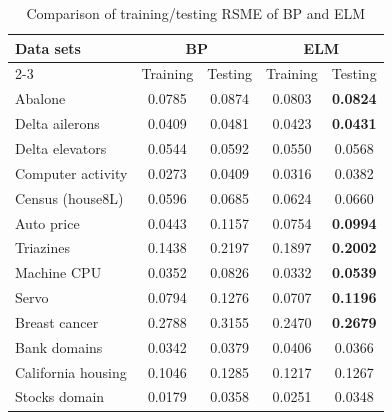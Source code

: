 \documentclass[12pt]{article}
\begin{document}
\begin{table}[h]
\centering
\caption{Comparison of training/testing RSME of BP and ELM}
\label{tab:elm_bp}
\begin{tabular}{@{}lcccc@{}}
\hline
\textbf{Data sets} & \multicolumn{2}{c}{\textbf{BP}} & \multicolumn{2}{c}{\textbf{ELM}} \\
\cline{2-3} \cline{4-5}
 & Training & Testing & Training & Testing \\
\hline
Abalone & 0.0785 & 0.0874 & 0.0803 & \textbf{0.0824} \\
Delta ailerons & 0.0409 & 0.0481 & 0.0423 & \textbf{0.0431} \\
Delta elevators & 0.0544 & 0.0592 & 0.0550 & 0.0568 \\
Computer activity & 0.0273 & 0.0409 & 0.0316 & 0.0382 \\
Census (house8L) & 0.0596 & 0.0685 & 0.0624 & 0.0660 \\
Auto price & 0.0443 & 0.1157 & 0.0754 & \textbf{0.0994} \\
Triazines & 0.1438 & 0.2197 & 0.1897 & \textbf{0.2002} \\
Machine CPU & 0.0352 & 0.0826 & 0.0332 & \textbf{0.0539} \\
Servo & 0.0794 & 0.1276 & 0.0707 & \textbf{0.1196} \\
Breast cancer & 0.2788 & 0.3155 & 0.2470 & \textbf{0.2679} \\
Bank domains & 0.0342 & 0.0379 & 0.0406 & 0.0366 \\
California housing & 0.1046 & 0.1285 & 0.1217 & 0.1267 \\
Stocks domain & 0.0179 & 0.0358 & 0.0251 & 0.0348 \\
\hline
\end{tabular}
\end{table}
\end{document}
